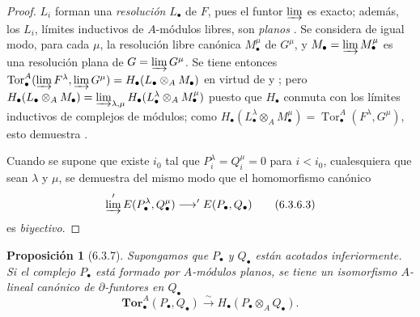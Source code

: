 \documentclass[10pt,oneside,openany]{book}
\theoremstyle{egaenv}\newtheorem*{env}{---}
\theoremstyle{egastatement}
\newtheorem*{proposition}{Proposición}
\theoremstyle{egadescription}
\begin{document}
\begin{proof}
$L_i$ forman una \emph{resolución} $L_\bullet$ de $F$, pues el funtor
$\varinjlim$ es exacto; además, los $L_i$, límites inductivos de
$A$-módulos libres, son \emph{planos} . Se considera de
igual modo, para cada $\mu$, la resolución libre canónica $M_\bullet^\mu$ de
$G^\mu$, y $M_\bullet=\varinjlim M_\bullet^\mu$ es una resolución plana
de $G=\varinjlim G^\mu$. Se tiene entonces
$\operatorname{Tor}_\bullet^A(\varinjlim F^\lambda,
\varinjlim G^\mu)=H_\bullet(L_\bullet\otimes_A M_\bullet)$ en virtud de
 y ; pero
$H_\bullet(L_\bullet\otimes_A M_\bullet)
=\varinjlim_{\lambda,\mu}
H_\bullet(L_\bullet^\lambda\otimes_A M_\bullet^\mu)$
puesto que $H_\bullet$ conmuta con los límites inductivos de complejos de
módulos; como $H_\bullet(L_\bullet^\lambda\otimes_A M_\bullet^\mu)
=\operatorname{Tor}_\bullet^A(F^\lambda,G^\mu)$, esto demuestra
.

Cuando se supone que existe $i_0$ tal que
$P_i^\lambda=Q_i^\mu=0$ para $i<i_0$, cualesquiera que sean $\lambda$ y
$\mu$, se demuestra del mismo modo que el homomorfismo canónico
\[
  \varinjlim'E(P_\bullet^\lambda,Q_\bullet^\mu)
  \longrightarrow'E(P_\bullet,Q_\bullet)
  \tag{6.3.6.3}\label{III.6.3.6.3.fr}
\]
es \emph{biyectivo}.
\end{proof}

\begin{proposition}[6.3.7]
\label{III.6.3.7}
Supongamos que $P_\bullet$ y $Q_\bullet$ están acotados inferiormente. Si el
complejo $P_\bullet$ está formado por $A$-módulos planos, se tiene un
isomorfismo $A$-lineal canónico de $\partial$-funtores en $Q_\bullet$
\[
  \mathbf{Tor}_\bullet^A(P_\bullet,Q_\bullet)
  \xrightarrow{\sim}H_\bullet(P_\bullet\otimes_A Q_\bullet).
  \tag{6.3.7.1}\label{III.6.3.7.1.fr}
\]
\end{proposition}
\end{document}
